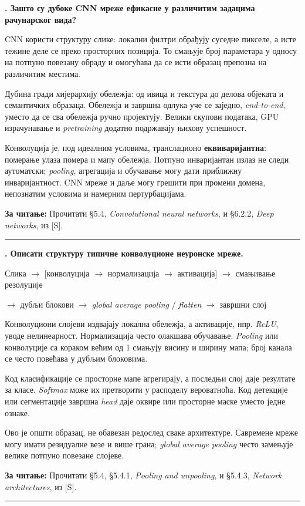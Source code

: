 \documentclass[10pt,a4paper]{article}
\newcommand{\en}[1]{\textit{#1}}
\newcounter{pitanje}
\newenvironment{odgovor}[1]{\stepcounter{pitanje}\begin{minipage}[t][0.455\textheight][t]{\textwidth}\vspace{0pt}\textbf{\thepitanje. #1}\par\smallskip}{\end{minipage}\par\ifodd\value{pitanje}\vspace{0.025\textheight}\hrule\vspace{0.015\textheight}\else\newpage\fi}
\newcommand{\izvor}[1]{\par\vfill{\footnotesize\textbf{За читање:} #1}\par}
\newcommand{\lanac}[1]{\begin{center}\small #1\end{center}}
\begin{document}
\begin{odgovor}{Зашто су дубоке CNN мреже ефикасне у различитим задацима рачунарског вида?}
CNN користи структуру слике: локални филтри обрађују суседне пикселе, а исте тежине деле се преко просторних позиција. То смањује број параметара у односу на потпуно повезану обраду и омогућава да се исти образац препозна на различитим местима.

Дубина гради хијерархију обележја: од ивица и текстура до делова објеката и семантичких образаца. Обележја и завршна одлука уче се заједно, \en{end-to-end}, уместо да се сва обележја ручно пројектују. Велики скупови података, GPU израчунавање и \en{pretraining} додатно подржавају њихову успешност.

Конволуција је, под идеалним условима, транслационо \textbf{еквиваријантна}: померање улаза помера и мапу обележја. Потпуно инваријантан излаз не следи аутоматски; \en{pooling}, агрегација и обучавање могу дати приближну инваријантност. CNN мреже и даље могу грешити при промени домена, непознатим условима и намерним пертурбацијама.
\izvor{Прочитати §5.4, \en{Convolutional neural networks}, и §6.2.2, \en{Deep networks}, из [S].}
\end{odgovor}

\begin{odgovor}{Описати структуру типичне конволуционе неуронске мреже.}
\lanac{Слика $\to$ [конволуција $\to$ нормализација $\to$ активација] $\to$ смањивање резолуције}
\lanac{$\to$ дубљи блокови $\to$ \en{global average pooling} / \en{flatten} $\to$ завршни слој}
Конволуциони слојеви издвајају локална обележја, а активације, нпр. \en{ReLU}, уводе нелинеарност. Нормализација често олакшава обучавање. \en{Pooling} или конволуције са кораком већим од 1 смањују висину и ширину мапа; број канала се често повећава у дубљим блоковима.

Код класификације се просторне мапе агрегирају, а последњи слој даје резултате за класе. \en{Softmax} може их претворити у расподелу вероватноћа. Код детекције или сегментације завршна \en{head} даје оквире или просторне маске уместо једне ознаке.

Ово је општи образац, не обавезан редослед сваке архитектуре. Савремене мреже могу имати резидуалне везе и више грана; \en{global average pooling} често замењује велике потпуно повезане слојеве.
\izvor{Прочитати §5.4, §5.4.1, \en{Pooling and unpooling}, и §5.4.3, \en{Network architectures}, из [S].}
\end{odgovor}
\end{document}
